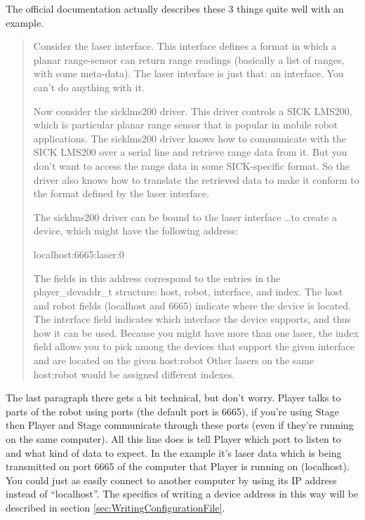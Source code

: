 \documentclass[a4paper]{report}
\newcommand{\pl}{Player\xspace}
\begin{document}
The official documentation actually describes these 3 things quite well with an example.

\begin{quotation}
	Consider the laser interface. This interface defines a format in which a planar range-sensor can return range readings (basically a list of ranges, with some meta-data). The laser interface is just that: an interface. You can't do anything with it.

	Now consider the sicklms200 driver. This driver controls a SICK LMS200, which is particular planar range sensor that is popular in mobile robot applications. The sicklms200 driver knows how to communicate with the SICK LMS200 over a serial line and retrieve range data from it. But you don't want to access the range data in some SICK-specific format. So the driver also knows how to translate the retrieved data to make it conform to the format defined by the laser interface.

	The sicklms200 driver can be bound to the laser interface \ldots to create a device, which might have the following address:

	localhost:6665:laser:0 \label{sec:setting_a_device}

	The fields in this address correspond to the entries in the \mbox{player\_devaddr\_t} structure: host, robot, interface, and index. The host and robot fields (localhost and 6665) indicate where the device is located. The interface field indicates which interface the device supports, and thus how it can be used. Because you might have more than one laser, the index field allows you to pick among the devices that support the given interface and are located on the given host:robot Other lasers on the same host:robot would be assigned different indexes.
\end{quotation}
The last paragraph there gets a bit technical, but don't worry. \pl talks to parts of the robot using ports (the default port is 6665), if you're using Stage then \pl and Stage communicate through these ports (even if they're running on the same computer). All this line does is tell \pl which port to listen to and what kind of data to expect. In the example it's laser data which is being transmitted on port 6665 of the computer that \pl is running on (localhost). You could just as easily connect to another computer by using its IP address instead of ``localhost''. The specifics of writing a device address in this way will be described in section \ref{sec:WritingConfigurationFile}.
\end{document}
